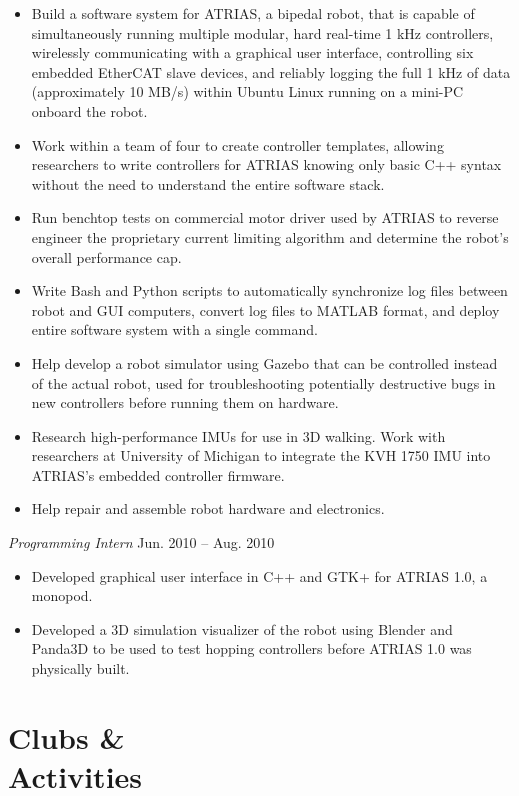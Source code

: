 \documentclass[10pt,letterpaper,margin]{res}
\begin{document}
\begin{resume}
\begin{itemize}
	\item Build a software system for ATRIAS, a bipedal robot, that is capable
		of simultaneously running multiple modular, hard real-time 1 kHz
		controllers, wirelessly communicating with a graphical user interface,
		controlling six embedded EtherCAT slave devices, and reliably logging
		the full 1 kHz of data (approximately 10 MB/s) within Ubuntu Linux
		running on a mini-PC onboard the robot.
	\item Work within a team of four to create controller templates, allowing
		researchers to write controllers for ATRIAS knowing only basic C++
		syntax without the need to understand the entire software stack.
	\item Run benchtop tests on commercial motor driver used by ATRIAS to
		reverse engineer the proprietary current limiting algorithm and
		determine the robot's overall performance cap.
	\item Write Bash and Python scripts to automatically synchronize log files
		between robot and GUI computers, convert log files to MATLAB format,
		and deploy entire software system with a single command.
	\item Help develop a robot simulator using Gazebo that can be controlled
		instead of the actual robot, used for troubleshooting potentially
		destructive bugs in new controllers before running them on hardware.
	\item Research high-performance IMUs for use in 3D walking. Work with
		researchers at University of Michigan to integrate the KVH 1750 IMU
		into ATRIAS's embedded controller firmware.
	\item Help repair and assemble robot hardware and electronics.
\end{itemize}

{\it Programming Intern} \hfill {\color{lightgray} Jun. 2010 -- Aug. 2010}\vspace{0.2em}

\begin{itemize}
	\item Developed graphical user interface in C++ and GTK+ for ATRIAS 1.0,
		a monopod.
	\item Developed a 3D simulation visualizer of the robot using Blender and
		Panda3D to be used to test hopping controllers before ATRIAS 1.0 was
		physically built.
\end{itemize}



\section{Clubs \& \\ Activities}


\end{resume}
\end{document}
